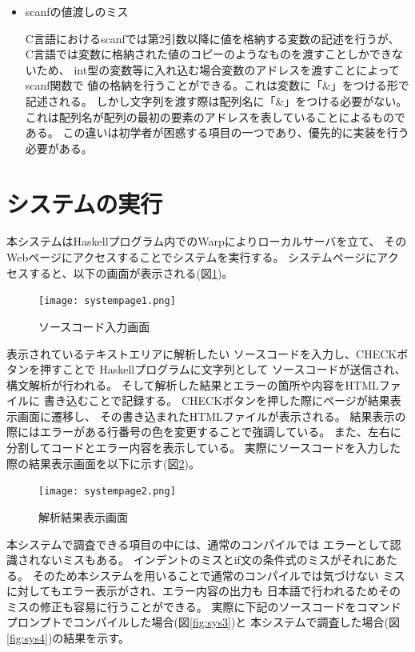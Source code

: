 \documentclass{csspaper}
\begin{document}
\begin{itemize}
         \item scanfの値渡しのミス
         
         C言語におけるscanfでは第2引数以降に値を格納する変数の記述を行うが、
         C言語では変数に格納された値のコピーのようなものを渡すことしかできないため、
         int型の変数等に入れ込む場合変数のアドレスを渡すことによってscanf関数で
         値の格納を行うことができる。これは変数に「\&」をつける形で記述される。
         しかし文字列を渡す際は配列名に「\&」をつける必要がない。
         これは配列名が配列の最初の要素のアドレスを表していることによるものである。
         この違いは初学者が困惑する項目の一つであり、優先的に実装を行う
         必要がある。

      \end{itemize}

      \section{システムの実行}
      本システムはHaskellプログラム内でのWarpによりローカルサーバを立て、
      そのWebページにアクセスすることでシステムを実行する。
      システムページにアクセスすると、以下の画面が表示される(図\ref{fig:sys1})。

      \begin{figure}[p]
         \centering
         \texttt{[image: systempage1.png]}
         \caption{ソースコード入力画面}
         \label{fig:sys1}
      \end{figure}

      表示されているテキストエリアに解析したい
      ソースコードを入力し、CHECKボタンを押すことで
      Haskellプログラムに文字列として
      ソースコードが送信され、構文解析が行われる。
      そして解析した結果とエラーの箇所や内容をHTMLファイルに
      書き込むことで記録する。
      CHECKボタンを押した際にページが結果表示画面に遷移し、
      その書き込まれたHTMLファイルが表示される。
      結果表示の際にはエラーがある行番号の色を変更することで強調している。
      また、左右に分割してコードとエラー内容を表示している。
      実際にソースコードを入力した際の結果表示画面を以下に示す(図\ref{fig:sys2})。

      \begin{figure}[h]
         \centering
         \texttt{[image: systempage2.png]}
         \caption{解析結果表示画面}
         \label{fig:sys2}
      \end{figure}

      本システムで調査できる項目の中には、通常のコンパイルでは
      エラーとして認識されないミスもある。
      インデントのミスとif文の条件式のミスがそれにあたる。
      そのため本システムを用いることで通常のコンパイルでは気づけない
      ミスに対してもエラー表示がされ、エラー内容の出力も
      日本語で行われるためそのミスの修正も容易に行うことができる。
      実際に下記のソースコードをコマンドプロンプトでコンパイルした場合(図\ref{fig:sys3})と
      本システムで調査した場合(図\ref{fig:sys4})の結果を示す。
\end{document}
